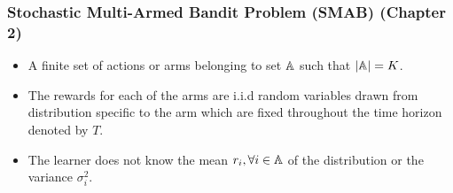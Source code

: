 \begin{frame}
\frametitle{Stochastic Multi-Armed Bandit Problem (SMAB) ({Chapter 2})}
\begin{itemize}
\item<1-> A finite set of actions or arms belonging to set $\mathbb{A}$ such that $|\mathbb{A}|=K$. 
\item<2-> The rewards for each of the arms are i.i.d random variables drawn from distribution specific to the arm which are fixed throughout the time horizon denoted by $T$.
\item<3-> The learner does not know the mean $r_{i},\forall i\in \mathbb{A}$ of the distribution or the variance $\sigma_i^2$. 
\end{itemize}
\end{frame}



